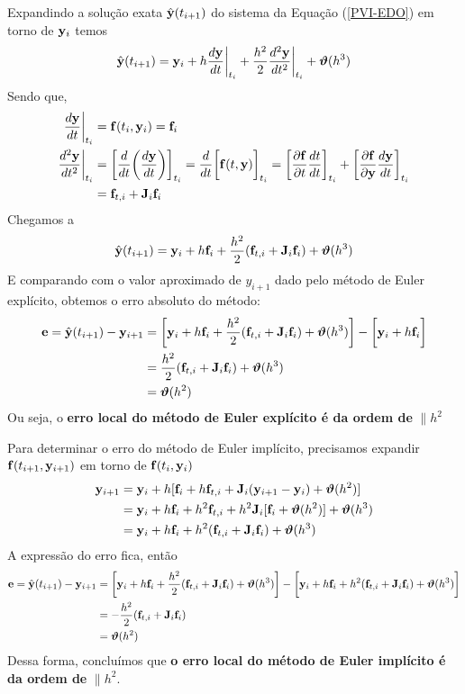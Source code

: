 \documentclass[12pt]{peqdoc}
\begin{document}
	Expandindo a solução exata $\hat{\mathbf{y}}(t_{i+1})$ do sistema da Equação (\ref{PVI-EDO}) em torno de $\mathbf{y}_i$ temos
	\begin{equation}
	\hat{\mathbf{y}}(t_{i+1}) = \mathbf{y}_i + h\frac{d\mathbf{y}}{dt}\bigg|_{t_i} + \frac{h^2}{2} \frac{d^2\mathbf{y}}{dt^2}\bigg|_{t_i} + \boldsymbol{\vartheta}(h^3)
	\end{equation}
	\noindent Sendo que,
	\begin{align}
	\frac{d\mathbf{y}}{dt}\bigg|_{t_i} &= \mathbf{f}(t_i,\mathbf{y}_i) = \mathbf{f}_i\\
	\frac{d^2\mathbf{y}}{dt^2}\bigg|_{t_i} &= \bigg[\frac{d}{dt}\bigg(\frac{d\mathbf{y}}{dt}\bigg)\bigg]_{t_i} = \frac{d}{dt}\bigg[\mathbf{f}(t,\mathbf{y})\bigg]_{t_i}=\bigg[\frac{\partial \mathbf{f}}{\partial t}\frac{dt}{dt}\bigg]_{t_i} + \bigg[\frac{\partial \mathbf{f}}{\partial \mathbf{y}}\frac{d\mathbf{y}}{dt}\bigg]_{t_i}\nonumber\\
	&=\mathbf{f}_{t,i} + \mathbf{J}_i\mathbf{f}_i
	\end{align}
	\noindent Chegamos a
	\begin{equation}
	\hat{\mathbf{y}}(t_{i+1}) = \mathbf{y}_i + h\mathbf{f}_i + \frac{h^2}{2} (\mathbf{f}_{t,i} + \mathbf{J}_i\mathbf{f}_i) + \boldsymbol{\vartheta}(h^3)
	\end{equation}
	\noindent E comparando com o valor aproximado de $y_{i+1}$ dado pelo método de Euler explícito, obtemos o erro absoluto do método:
	\begin{align}
	\mathbf{e} = \hat{\mathbf{y}}(t_{i+1}) - \mathbf{y}_{i+1} &= \bigg[\mathbf{y}_i + h\mathbf{f}_i + \frac{h^2}{2} (\mathbf{f}_{t,i} + \mathbf{J}_i\mathbf{f}_i) + \boldsymbol{\vartheta}(h^3)\bigg] - \bigg[\mathbf{y}_i + h\mathbf{f}_i\bigg]\nonumber\\
	&= \frac{h^2}{2} (\mathbf{f}_{t,i} + \mathbf{J}_i\mathbf{f}_i) + \boldsymbol{\vartheta}(h^3)\nonumber\\
	&= \boldsymbol{\vartheta}(h^2)
	\end{align}
	\noindent Ou seja, o \textbf{erro local do método de Euler explícito é da ordem de} $\|h^2$
	
	Para determinar o erro do método de Euler implícito, precisamos expandir $\mathbf{f}(t_{i+1},\mathbf{y}_{i+1})$ em torno de $\mathbf{f}(t_i,\mathbf{y}_i)$
	\begin{align}
	\mathbf{y}_{i+1} &= \mathbf{y}_i + h[\mathbf{f}_i + h\mathbf{f}_{t,i} + \mathbf{J}_i(\mathbf{y}_{i+1}-\mathbf{y}_i)+\boldsymbol{\vartheta}(h^2)]\nonumber\\
	&=\mathbf{y}_i+h\mathbf{f}_i + h^2\mathbf{f}_{t,i} + h^2 \mathbf{J}_i[\mathbf{f}_i+\boldsymbol{\vartheta}(h^2)]+\boldsymbol{\vartheta}(h^3)\nonumber\\
	&=\mathbf{y}_i+h\mathbf{f}_i + h^2(\mathbf{f}_{t,i} + \mathbf{J}_i\mathbf{f}_i) +\boldsymbol{\vartheta}(h^3)
	\end{align}
	\noindent A expressão do erro fica, então
	\begin{align}
	\mathbf{e} = \hat{\mathbf{y}}(t_{i+1}) - \mathbf{y}_{i+1} &= \bigg[\mathbf{y}_i + h\mathbf{f}_i + \frac{h^2}{2} (\mathbf{f}_{t,i} + \mathbf{J}_i\mathbf{f}_i) + \boldsymbol{\vartheta}(h^3)\bigg] - \bigg[\mathbf{y}_i+h\mathbf{f}_i + h^2(\mathbf{f}_{t,i} + \mathbf{J}_i\mathbf{f}_i) +\boldsymbol{\vartheta}(h^3)\bigg]\nonumber\\
	&= -\frac{h^2}{2} (\mathbf{f}_{t,i} + \mathbf{J}_i\mathbf{f}_i)\nonumber\\
	&= \boldsymbol{\vartheta}(h^2)
	\end{align}
	\noindent Dessa forma, concluímos que \textbf{o erro local do método de Euler implícito é da ordem de} $\|h^2$.
	
\end{document}

